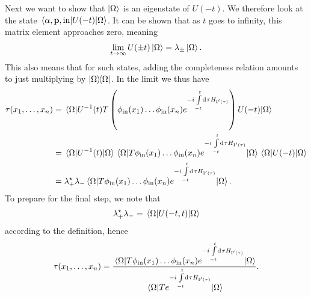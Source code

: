 Next we want to show that $\ket{\Omega}$ is an eigenstate of $U(-t)$. We therefore look at the state $\mel{\alpha, \vb{p}, \text{in}}{U(-t)}{\Omega}$. It can be shown that as $t$ goes to infinity, this matrix element approaches zero, meaning
\begin{align*}
	\lim\limits_{t\to\infty}U(\pm t)\ket{\Omega} = \lambda_{\pm}\ket{\Omega}.
\end{align*}
This also means that for such states, adding the completeness relation amounts to just multiplying by $\op{\Omega}$. In the limit we thus have
\begin{align*}
	\tau(x_{1}, \dots, x_{n}) &= \expval{U^{-1}(t)\ensuremath{T}\left(\phi_{\text{in}}(x_{1})\dots \phi_{\text{in}}(x_{n})e^{-i\int\limits_{-t}^{t}\dd[]{\tau}H_{\text{I}\ensuremath{^{\prime}}(\tau)}}\right)U(-t)}{\Omega} \\ 
	                          &=\expval{U^{-1}(t)}{\Omega}\expval{\ensuremath{T}\phi_{\text{in}}(x_{1})\dots \phi_{\text{in}}(x_{n})e^{-i\int\limits_{-t}^{t}\dd[]{\tau}H_{\text{I}\ensuremath{^{\prime}}(\tau)}}}{\Omega}\expval{U(-t)}{\Omega} \\
	                          &= \lambda_{+}^{\star}\lambda_{-}\expval{\ensuremath{T}\phi_{\text{in}}(x_{1})\dots \phi_{\text{in}}(x_{n})e^{-i\int\limits_{-t}^{t}\dd[]{\tau}H_{\text{I}\ensuremath{^{\prime}}(\tau)}}}{\Omega}.
\end{align*}
To prepare for the final step, we note that
\begin{align*}
	\lambda_{+}^{\star}\lambda_{-} = \expval{U(-t, t)}{\Omega}
\end{align*}
according to the definition, hence
\begin{align*}
	\tau(x_{1}, \dots, x_{n}) = \frac{\expval{\ensuremath{T}\phi_{\text{in}}(x_{1})\dots \phi_{\text{in}}(x_{n})e^{-i\int\limits_{-t}^{t}\dd[]{\tau}H_{\text{I}\ensuremath{^{\prime}}(\tau)}}}{\Omega}}{\expval{\ensuremath{T}e^{-i\int\limits_{-t}^{t}\dd[]{\tau}H_{\text{I}\ensuremath{^{\prime}}(\tau)}}}{\Omega}}.
\end{align*}
